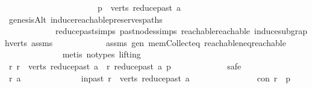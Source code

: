 \begin{isabellebody}
\ \ \ \ \ \ \ \ \isamarkupfalse%
\ \isanewline
\ \ \ \ \ \ \ \ \ \ \isamarkupfalse%
\ {\isachardoublequoteopen}p\ {\isasymin}\ verts\ {\isacharparenleft}{\kern0pt}reduce{\isacharunderscore}{\kern0pt}past\ a{\isacharparenright}{\kern0pt}{\isachardoublequoteclose}\ \isamarkupfalse%
\ genesisAlt\ induce{\isacharunderscore}{\kern0pt}reachable{\isacharunderscore}{\kern0pt}preserves{\isacharunderscore}{\kern0pt}paths\isanewline
\ \ \ \ \ \ \ \ \ \ \ \ reduce{\isacharunderscore}{\kern0pt}past{\isachardot}{\kern0pt}simps\ past{\isacharunderscore}{\kern0pt}nodes{\isachardot}{\kern0pt}simps\ reachable{}{\isacharunderscore}{\kern0pt}reachable\ induce{\isacharunderscore}{\kern0pt}subgraph{\isacharunderscore}{\kern0pt}verts\ assms{\isacharparenleft}{\kern0pt}{}{\isacharparenright}{\kern0pt}\isanewline
\ \ \ \ \ \ \ \ \ \ \ \ assms{\isacharparenleft}{\kern0pt}{}{\isacharparenright}{\kern0pt}\ gen\ mem{\isacharunderscore}{\kern0pt}Collect{\isacharunderscore}{\kern0pt}eq\ reachable{\isacharunderscore}{\kern0pt}neq{\isacharunderscore}{\kern0pt}reachable{}\isanewline
\ \ \ \ \ \ \ \ \ \ \ \ \isamarkupfalse%
\ {\isacharparenleft}{\kern0pt}metis\ {\isacharparenleft}{\kern0pt}no{\isacharunderscore}{\kern0pt}types{\isacharcomma}{\kern0pt}\ lifting{\isacharparenright}{\kern0pt}{\isacharparenright}{\kern0pt}\ \isanewline
\ \ \ \ \ \ \ \ \ \ \ \ \isanewline
\ \ \ \ \ \ \ \ \isamarkupfalse%
\ \ \ \ \isanewline
\ \ \ \ \ \ \ \ \ \ \isamarkupfalse%
\ {\isachardoublequoteopen}{\isasymforall}r{\isachardot}{\kern0pt}\ r\ {\isasymin}\ verts\ {\isacharparenleft}{\kern0pt}reduce{\isacharunderscore}{\kern0pt}past\ a{\isacharparenright}{\kern0pt}\ {\isasymlongrightarrow}\ r\ {\isasymrightarrow}\isactrlsup {\isacharasterisk}{\kern0pt}\isactrlbsub reduce{\isacharunderscore}{\kern0pt}past\ a\isactrlesub \ p{\isachardoublequoteclose}\ \isanewline
\ \ \ \ \ \ \ \ \ \ \isamarkupfalse%
\ safe\isanewline
\ \ \ \ \ \ \ \ \ \ \ \ \isamarkupfalse%
\ r\ a\isanewline
\ \ \ \ \ \ \ \ \ \ \ \ \isamarkupfalse%
\ in{\isacharunderscore}{\kern0pt}past{\isacharcolon}{\kern0pt}\ {\isachardoublequoteopen}r\ {\isasymin}\ verts\ {\isacharparenleft}{\kern0pt}reduce{\isacharunderscore}{\kern0pt}past\ a{\isacharparenright}{\kern0pt}{\isachardoublequoteclose}\isanewline
\ \ \ \ \ \ \ \ \ \ \ \ \isamarkupfalse%
\ \isamarkupfalse%
\ con{\isacharcolon}{\kern0pt}\ {\isachardoublequoteopen}r\ {\isasymrightarrow}\isactrlsup {\isacharasterisk}{\kern0pt}\ p{\isachardoublequoteclose}\ \isamarkupfalse%

\end{isabellebody}
